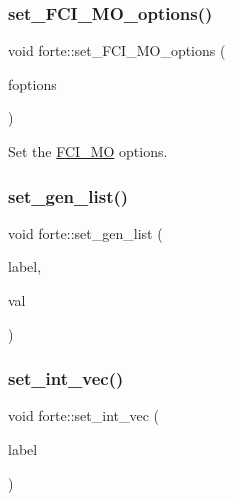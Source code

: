 \mbox{\label{namespaceforte_a2b7a4e31e90b2922d905a3b132eb29cd}} 
\subsubsection{\texorpdfstring{set\+\_\+\+F\+C\+I\+\_\+\+M\+O\+\_\+options()}{set\_FCI\_MO\_options()}}
{\footnotesize\ttfamily void forte\+::set\+\_\+\+F\+C\+I\+\_\+\+M\+O\+\_\+options (\begin{DoxyParamCaption}\item[{\mbox{\hyperlink{classforte_1_1_forte_options}{Forte\+Options}} \&}]{foptions }\end{DoxyParamCaption})}



Set the \mbox{\hyperlink{classforte_1_1_f_c_i___m_o}{F\+C\+I\+\_\+\+MO}} options. 

\mbox{\label{namespaceforte_a6ab9850b9eb81ebf20b8041581f5e88f}} 
\subsubsection{\texorpdfstring{set\+\_\+gen\+\_\+list()}{set\_gen\_list()}}
{\footnotesize\ttfamily void forte\+::set\+\_\+gen\+\_\+list (\begin{DoxyParamCaption}\item[{const std\+::string \&}]{label,  }\item[{py\+::list}]{val }\end{DoxyParamCaption})}

\mbox{\label{namespaceforte_acbfd686ccc14f5aef30974a61fd051a4}} 
\subsubsection{\texorpdfstring{set\+\_\+int\+\_\+vec()}{set\_int\_vec()}}
{\footnotesize\ttfamily void forte\+::set\+\_\+int\+\_\+vec (\begin{DoxyParamCaption}\item[{const std\+::string \&}]{label }\end{DoxyParamCaption})}


